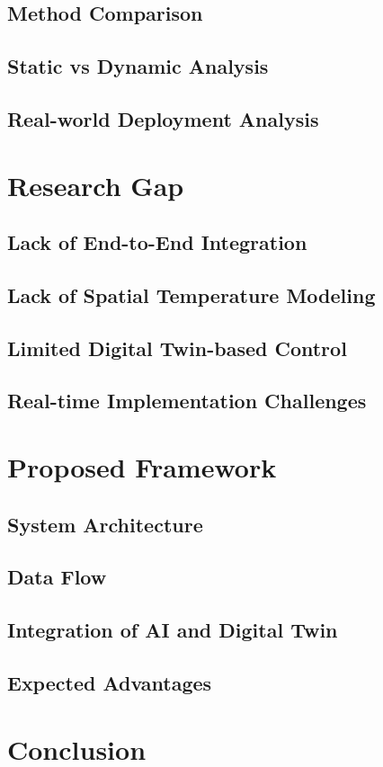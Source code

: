 \documentclass[12pt,a4paper]{article}
\begin{document}
\subsection{Method Comparison}
\subsection{Static vs Dynamic Analysis}
\subsection{Real-world Deployment Analysis}

\section{Research Gap}

\subsection{Lack of End-to-End Integration}
\subsection{Lack of Spatial Temperature Modeling}
\subsection{Limited Digital Twin-based Control}
\subsection{Real-time Implementation Challenges}

\section{Proposed Framework}

\subsection{System Architecture}
\subsection{Data Flow}
\subsection{Integration of AI and Digital Twin}
\subsection{Expected Advantages}

\section{Conclusion}
\end{document}
